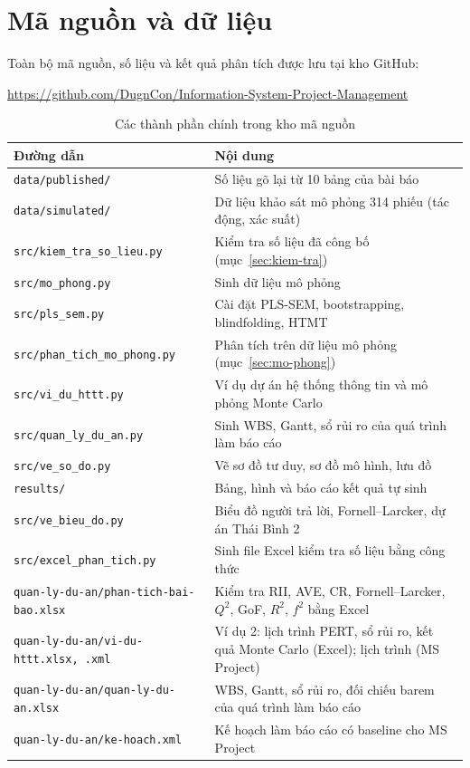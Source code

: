 \chapter{Mã nguồn và dữ liệu}

Toàn bộ mã nguồn, số liệu và kết quả phân tích được lưu tại kho GitHub:
\begin{center}
\url{https://github.com/DugnCon/Information-System-Project-Management}
\end{center}

\begin{table}[H]
\centering
\caption{Các thành phần chính trong kho mã nguồn}
\begin{tabularx}{\textwidth}{@{}lX@{}}
\toprule
\textbf{Đường dẫn} & \textbf{Nội dung} \\
\midrule
\texttt{data/published/} & Số liệu gõ lại từ 10 bảng của bài báo \\
\texttt{data/simulated/} & Dữ liệu khảo sát mô phỏng 314 phiếu (tác động, xác suất) \\
\texttt{src/kiem\_tra\_so\_lieu.py} & Kiểm tra số liệu đã công bố (mục~\ref{sec:kiem-tra}) \\
\texttt{src/mo\_phong.py} & Sinh dữ liệu mô phỏng \\
\texttt{src/pls\_sem.py} & Cài đặt PLS-SEM, bootstrapping, blindfolding, HTMT \\
\texttt{src/phan\_tich\_mo\_phong.py} & Phân tích trên dữ liệu mô phỏng (mục~\ref{sec:mo-phong}) \\
\texttt{src/vi\_du\_httt.py} & Ví dụ dự án hệ thống thông tin và mô phỏng Monte Carlo \\
\texttt{src/quan\_ly\_du\_an.py} & Sinh WBS, Gantt, sổ rủi ro của quá trình làm báo cáo \\
\texttt{src/ve\_so\_do.py} & Vẽ sơ đồ tư duy, sơ đồ mô hình, lưu đồ \\
\texttt{results/} & Bảng, hình và báo cáo kết quả tự sinh \\
\texttt{src/ve\_bieu\_do.py} & Biểu đồ người trả lời, Fornell--Larcker, dự án Thái Bình 2 \\
\texttt{src/excel\_phan\_tich.py} & Sinh file Excel kiểm tra số liệu bằng công thức \\
\texttt{quan-ly-du-an/phan-tich-bai-bao.xlsx} & Kiểm tra RII, AVE, CR, Fornell--Larcker, $Q^2$, GoF, $R^2$, $f^2$ bằng Excel \\
\texttt{quan-ly-du-an/vi-du-httt.xlsx, .xml} & Ví dụ 2: lịch trình PERT, sổ rủi ro, kết quả Monte Carlo (Excel); lịch trình (MS Project) \\
\texttt{quan-ly-du-an/quan-ly-du-an.xlsx} & WBS, Gantt, sổ rủi ro, đối chiếu barem của quá trình làm báo cáo \\
\texttt{quan-ly-du-an/ke-hoach.xml} & Kế hoạch làm báo cáo có baseline cho MS Project \\
\bottomrule
\end{tabularx}
\end{table}

